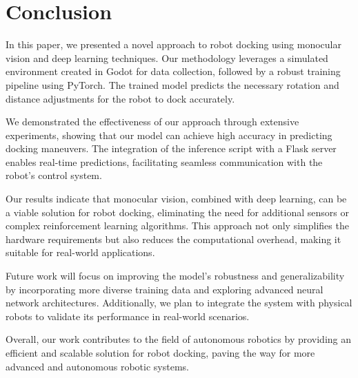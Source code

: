 \documentclass[twocolumn]{article}
\begin{document}
\section{Conclusion}
In this paper, we presented a novel approach to robot docking using monocular vision and deep learning techniques. Our methodology leverages a simulated environment created in Godot for data collection, followed by a robust training pipeline using PyTorch. The trained model predicts the necessary rotation and distance adjustments for the robot to dock accurately.

We demonstrated the effectiveness of our approach through extensive experiments, showing that our model can achieve high accuracy in predicting docking maneuvers. The integration of the inference script with a Flask server enables real-time predictions, facilitating seamless communication with the robot's control system.

Our results indicate that monocular vision, combined with deep learning, can be a viable solution for robot docking, eliminating the need for additional sensors or complex reinforcement learning algorithms. This approach not only simplifies the hardware requirements but also reduces the computational overhead, making it suitable for real-world applications.

Future work will focus on improving the model's robustness and generalizability by incorporating more diverse training data and exploring advanced neural network architectures. Additionally, we plan to integrate the system with physical robots to validate its performance in real-world scenarios.

Overall, our work contributes to the field of autonomous robotics by providing an efficient and scalable solution for robot docking, paving the way for more advanced and autonomous robotic systems.


\end{document}
